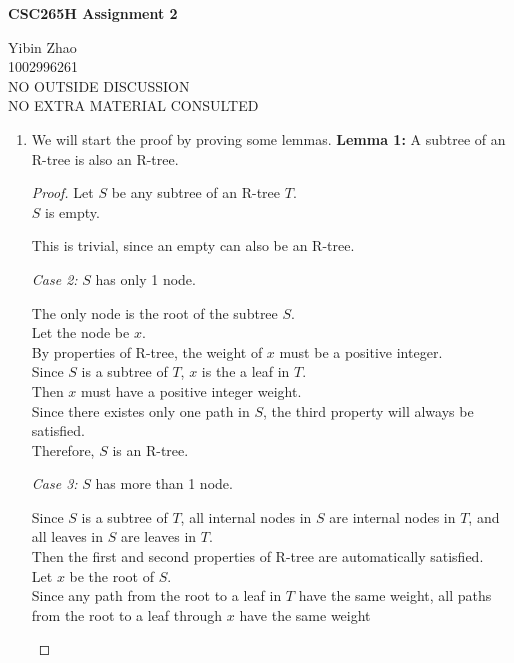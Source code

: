 \documentclass[10pt]{article}
\begin{document}
\begin{center}
{\bf \Large \bf CSC265H Assignment 2}\\
\end{center}

\noindent
Yibin Zhao\\
1002996261\\
NO OUTSIDE DISCUSSION\\
NO EXTRA MATERIAL CONSULTED\\

\begin{enumerate}

	\item We will start the proof by proving some lemmas. 
	\textbf{Lemma 1:} A subtree of an R-tree is also an R-tree.
	\begin{proof}
		Let $S$ be any subtree of an R-tree $T$. \\
		 $S$ is empty.
		\begin{addmargin}[1em]{0em}
			This is trivial, since an empty can also be an R-tree.
		\end{addmargin}
		\textit{Case 2:} $S$ has only 1 node.
		\begin{addmargin}[1em]{0em}
			The only node is the root of the subtree $S$. \\
			Let the node be $x$. \\
			By properties of R-tree, the weight of $x$ must be a positive
			integer. \\
			Since $S$ is a subtree of $T$, $x$ is the a leaf in $T$. \\
			Then $x$ must have a positive integer weight. \\
			Since there existes only one path in $S$, the third property will
			always be satisfied. \\
			Therefore, $S$ is an R-tree.
		\end{addmargin}
		\textit{Case 3:} $S$ has more than 1 node. \\
		\begin{addmargin}[1em]{0em}
			Since $S$ is a subtree of $T$, all internal nodes in $S$ are
			internal nodes in $T$, and all leaves in $S$ are leaves in $T$. \\
			Then the first and second properties of R-tree are automatically
			satisfied. \\
			Let $x$ be the root of $S$. \\
			Since any path from the root to a leaf in $T$ have the same weight,
			all paths from the root to a leaf through $x$ have the same weight

\end{addmargin}
\end{proof}
\end{enumerate}
\end{document}
